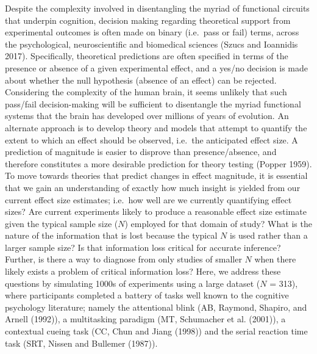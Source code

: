 \documentclass{article}
\begin{document}
Despite the complexity involved in disentangling the myriad of functional circuits that underpin cognition, decision making regarding theoretical support from experimental outcomes is often made on binary (i.e.~pass or fail) terms, across the psychological, neuroscientific and biomedical sciences (Szucs and Ioannidis 2017). Specifically, theoretical predictions are often specified in terms of the presence or absence of a given experimental effect, and a yes/no decision is made about whether the null hypothesis (absence of an effect) can be rejected. Considering the complexity of the human brain, it seems unlikely that such pass/fail decision-making will be sufficient to disentangle the myriad functional systems that the brain has developed over millions of years of evolution. An alternate approach is to develop theory and models that attempt to quantify the extent to which an effect should be observed, i.e.~the anticipated effect size. A prediction of magnitude is easier to disprove than presence/absence, and therefore constitutes a more desirable prediction for theory testing (Popper 1959). To move towards theories that predict changes in effect magnitude, it is essential that we gain an understanding of exactly how much insight is yielded from our current effect size estimates; i.e.~how well are we currently quantifying effect sizes? Are current experiments likely to produce a reasonable effect size estimate given the typical sample size (\(N\)) employed for that domain of study? What is the nature of the information that is lost because the typical \(N\) is used rather than a larger sample size? Is that information loss critical for accurate inference? Further, is there a way to diagnose from only studies of smaller \(N\) when there likely exists a problem of critical information loss? Here, we address these questions by simulating 1000s of experiments using a large dataset (\(N\) = 313), where participants completed a battery of tasks well known to the cognitive psychology literature; namely the attentional blink (AB, Raymond, Shapiro, and Arnell (1992)), a multitasking paradigm (MT, Schumacher et al. (2001)), a contextual cueing task (CC, Chun and Jiang (1998)) and the serial reaction time task (SRT, Nissen and Bullemer (1987)).
\end{document}

